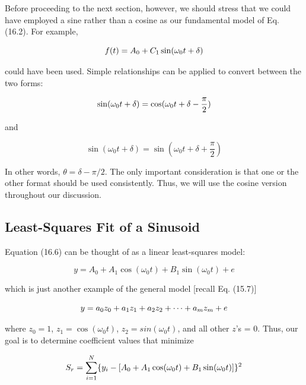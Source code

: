 \documentclass[../main.tex]{subfiles}
\begin{document}
Before proceeding to the next section, however, we should stress that we could have
employed a sine rather than a cosine as our fundamental model of Eq. (16.2). For example,

\begin{equation}
	\notag
	f(t) = A_0 + C_1 \sin(\omega_0 t + \delta)
\end{equation}

\noindent could have been used. Simple relationships can be applied to convert between the two forms:

\begin{equation}
	\notag
	\sin(\omega_0 t + \delta) = \cos(\omega_0 t + \delta - \frac{\pi}{2})
\end{equation}

\noindent and

\begin{equation}
	\tag{16.10}
	\sin(\omega_0 t + \delta) = \sin(\omega_0 t + \delta + \frac{\pi}{2})
\end{equation}

\noindent In other words, $\theta = \delta - \pi/2$. The only important consideration is that one or the other format
should be used consistently. Thus, we will use the cosine version throughout our discussion.

\label{cha:cha_P_16_1_1}
\subsection{Least-Squares Fit of a Sinusoid}

\noindent Equation (16.6) can be thought of as a linear least-squares model:

\begin{equation}
	\tag{16.11}
	y = A_0 + A_1 \cos(\omega_0 t) + B_1 \sin(\omega_0 t) + e
\end{equation}

\noindent which is just another example of the general model [recall Eq. (15.7)]

\begin{equation}
	\notag
	y = a_0 z_0 + a_1 z_1 + a_2 z_2 + \cdots + a_m z_m + e
\end{equation}

\noindent where $z_0 = 1$, $z_1 = \cos(\omega_0 t)$, $z_2 = sin(\omega_0 t)$, and all other $z$'s = 0. Thus, our goal is to determine coefficient values that minimize

\begin{equation}
	\notag
	S_r = \sum ^ N _ {i=1} \{ y_i - [A_0 + A_1 \cos(\omega_0 t) + B_1 \sin(\omega_0 t)]\}^2
\end{equation}
\end{document}
